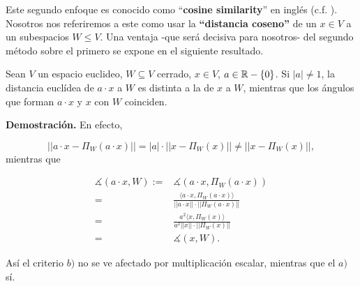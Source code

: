 Este segundo
enfoque es conocido como ``\textbf{cosine similarity}'' en
inglés (c.f. \cite{cosineSim}). Nosotros nos referiremos a 
este como usar la \textbf{``distancia coseno''} de un $x \in V$
a un subespacios $W \leq V$.
Una ventaja -que será decisiva
para nosotros- del segundo método sobre el primero se
expone en el siguiente resultado.


\begin{prop}
\label{prop: angulo se conserva bajo mult. esc.}
Sean $V$ un espacio euclideo, $W \subseteq V$ cerrado, $x \in V$,
$a \in \mathbb{R} - \{ 0 \}$. Si $|a| \neq 1$, la distancia euclídea 
de $a \cdot x$ a $W$ es distinta
a la de $x$ a $W$, mientras que los 
ángulos que forman $a \cdot x$ y $x$
con $W$ coinciden.
\end{prop}
\noindent
\textbf{Demostración.}
En efecto, 

\[
|| a \cdot x - \Pi_{W}(a \cdot x) || = |a| \cdot || x - \Pi_{W}(x) ||
\neq || x - \Pi_{W}(x) ||, 
\]
mientras que

\begin{align*}
\measuredangle (a \cdot x, W):=& \measuredangle(a \cdot x, \Pi_{W}(a \cdot x)) \\
= & \frac{\langle a \cdot x , \Pi_{W}(a \cdot x) \rangle}{|| a \cdot x || \cdot 
|| \Pi_{W}(a \cdot x)  ||} \\
= & \frac{a^{2}  \langle   x , \Pi_{W}(x) \rangle}{a^{2} ||  x || \cdot 
|| \Pi_{W}( x)  ||}  \\
= & \measuredangle (x, W).
\end{align*}


\QEDB
\vspace{0.2cm}

Así el criterio $b)$ no se ve afectado por multiplicación escalar,
mientras que el $a)$ sí.
 


